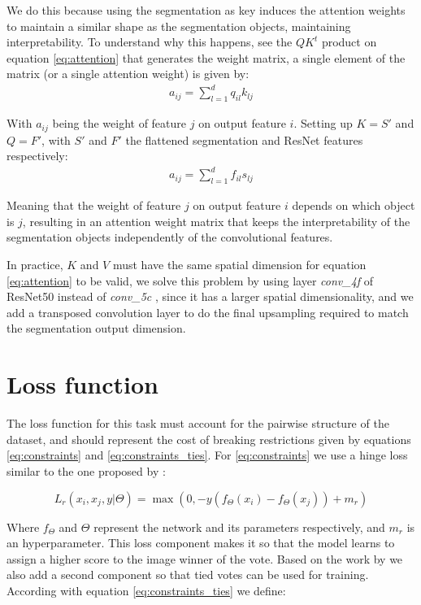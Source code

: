 We do this because using the segmentation as key induces the attention weights to maintain a similar shape as the segmentation objects,
maintaining interpretability. To understand why this happens, see the $QK^t$ product on equation \ref{eq:attention} that generates the
weight matrix, a single element of the matrix (or a single attention weight) is given by:
\begin{align}
	a_{ij} = \sum_{l=1}^d q_{il}k_{lj}
\end{align}

With $a_{ij}$ being the weight of feature $j$ on output feature $i$. Setting up $K=S'$  and $Q=F'$, with $S'$ and $F'$ the flattened segmentation and ResNet features
respectively:
\begin{align}
	a_{ij} = \sum_{l=1}^d f_{il}s_{lj}
\end{align}

Meaning that the weight of feature $j$ on output feature $i$ depends on which object is $j$, resulting in an attention weight matrix
that keeps the  interpretability of the segmentation objects independently of the convolutional features.

In practice, $K$ and $V$ must have the same spatial dimension for equation \ref{eq:attention} to be valid,
we solve this problem by using layer \textit{conv\_4f} of ResNet50 instead of \textit{conv\_5c}  , since it has a
larger spatial dimensionality, and we add a transposed convolution layer \cite{noh_deconv} to do the final upsampling
required to match the segmentation output dimension.



\section{Loss function} \label{section:loss}
The loss function for this task must account for the pairwise structure of the dataset,
and should represent the cost of breaking restrictions given by equations
\ref{eq:constraints} and \ref{eq:constraints_ties}. For \ref{eq:constraints} we use
a hinge loss similar to the one proposed by :

\begin{equation}
	L_r(x_i,x_j,y | \Theta) = \max(0, -y(f_\Theta(x_i) - f_\Theta(x_j)) + m_r)
	\label{eq:r_loss}
\end{equation}

Where $f_\Theta$ and $\Theta$  represent the network and its parameters respectively, and $m_r$
is an hyperparameter. This loss component makes it so that the model learns to assign a higher
score to the image winner of the vote. Based on the work by  we also add a second component so that tied votes can
be used for training. According with equation \ref{eq:constraints_ties} we define:


